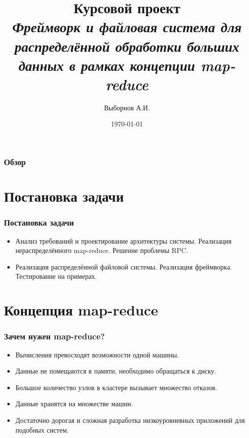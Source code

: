 \documentclass[utf8]{beamer}
\title[Distributed map-reduce]{Курсовой проект \\ \it{Фреймворк и файловая система для распределённой обработки больших данных в рамках концепции map-reduce}}
\author{Выборнов А.И.} %
\institute[МГТУ ИУ-9] {
    МГТУ~им.~Н.~Э.~Баумана \\
    \medskip
    \text{art-vybor@ya.com}
}
\date{\today}
\begin{document}
\begin{frame}
    \titlepage
\end{frame}


\begin{frame}
\frametitle{Обзор} 
\tableofcontents 
\end{frame}


\section{Постановка задачи}
    \begin{frame}
    \frametitle{Постановка задачи}
        \begin{itemize}
            \item Анализ требований и проектирование архитектуры системы. Реализация нераспределённого map-reduce. Решение проблемы RPC.
            \item Реализация распределённой файловой системы. Реализация фреймворка. Тестирование на примерах.
            
        \end{itemize} 
    \end{frame}

\section{Концепция map-reduce}
    \begin{frame}
    \frametitle{Зачем нужен map-reduce?}
        \begin{itemize}
            \item Вычисления превосходят возможности одной машины.  
            \item Данные не помещаются в памяти, необходимо обращаться к диску.
            \item Большое количество узлов в кластере вызывает множество отказов.
            \item Данные хранятся на множестве машин.
            \item Достаточно дорогая и сложная разработка низкоуровневных приложений для подобных систем.
        \end{itemize}
    \end{frame}
\end{document}
